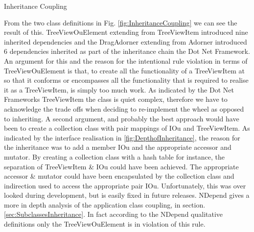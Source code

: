 \begin{multicols}{2}
			\begin{figurehere}
				\inputminted[linenos=true,fontsize=\footnotesize,tabsize=2,xleftmargin=1cm]{csharp}{pages/chapter4/smippets/inheritance.cs}
				\vspace{-4mm}
				\caption{Inheritance Coupling}
				\label{fig:InheritanceCoupling}
			\end{figurehere}
			
		\end{multicols}	

		\normalsize
		{
			From the two class definitions in Fig. \ref{fig:InheritanceCoupling} we can see the result of this.
			TreeViewOuElement extending from TreeViewItem introduced nine inherited dependencies 
			and the DragAdorner extending from Adorner introduced 6 dependencies inherited as part of the inheritance chain
			the Dot Net Framework.
			\newline
			\newline
			An argument for this and the reason for the intentional rule violation in terms of TreeViewOuElement is that,
			to create all the functionality of a TreeViewItem at so that it conforms or encompasses all the functionality that is
			required to realise it as a TreeViewItem, is simply too much work.  As indicated by the Dot Net Frameworks TreeViewItem
			the class is quiet complex, therefore we have to acknowledge the trade offs when deciding to re-implement the wheel
			as opposed to inheriting.  
			\newline
			\newline
			A second argument, and probably the best approach would have been to create a collection class with pair mappings
			of IOu and TreeViewItem.  As indicated by the interface realisation in \ref{fig:DepthofInheritance},  the reason
			for the inheritance was to add a member IOu and the appropriate accessor and mutator.  By creating a collection
			class with a hash table for instance, the separation of TreeViewItem \& IOu could have been achieved.  
			The appropriate accessor \& mutator could have been encapsulated by the collection class and indirection used to 
			access the appropriate pair IOu.  
			Unfortunately, this was over looked during development, but is easily fixed in future releases.
			\newline
			\newline
			NDepend gives a more in depth analysis of the application class coupling, in section. \ref{sec:SubclassesInheritance}.  
			In fact according to the NDepend qualitative definitions only the TreeViewOuElement is in violation of this rule.
		}			
			

